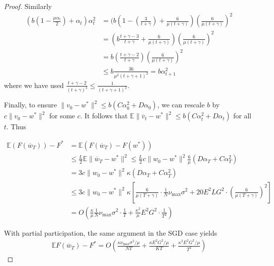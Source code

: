 \begin{proof}
Similarly 
\begin{align*}
(b(1-\frac{\mu\alpha_{t}}{2})+\alpha_{t})\alpha_{t}^{2} & =(b(1-(\frac{3}{t+\gamma})+\frac{6}{\mu(t+\gamma)})(\frac{6}{\mu(t+\gamma)})^{2}\\
& =(b\frac{t+\gamma-3}{t+\gamma}+\frac{6}{\mu(t+\gamma)})(\frac{6}{\mu(t+\gamma)})^{2}\\
& =b(\frac{t+\gamma-2}{t+\gamma})(\frac{6}{\mu(t+\gamma)})^{2}\\
& \leq b\frac{36}{\mu^{2}(t+\gamma+1)^{2}}=b\alpha_{t+1}^{2}
\end{align*}
where we have used $\frac{t+\gamma-2}{(t+\gamma)^{3}}\leq\frac{1}{(t+\gamma+1)^{2}}$.

Finally, to ensure $\|v_{0}-w^{\ast}\|^{2}\leq b(C\alpha_{0}^{2}+D\alpha_{0})$,
we can rescale $b$ by $c\|v_{0}-w^{\ast}\|^{2}$ for some $c.$ It
follows that $\mathbb{E}\|\overline{v}_{t}-w^{\ast}\|^{2}\leq b(C\alpha_{t}^{2}+D\alpha_{t})$
for all $t$. Thus 

\begin{align*}
\mathbb{E}(F(\overline{w}_{T}))-F^{\ast} & =\mathbb{E}(F(\overline{w}_{T})-F(w^{\ast}))\\
& \leq\frac{L}{2}\mathbb{E}\|\overline{w}_{T}-w^{\ast}\|^{2}\leq\frac{L}{2}c\|w_{0}-w^{\ast}\|^{2}\frac{6}{\mu}(D\alpha_{T}+C\alpha_{T}^{2})\\
& =3c\|w_{0}-w^{\ast}\|^{2}\kappa(D\alpha_{T}+C\alpha_{T}^{2})\\
& \leq3c\|w_{0}-w^{\ast}\|^{2}\kappa\left[\frac{6}{\mu(T+\gamma)}\cdot\frac{1}{N}\nu_{\max}\sigma^{2}+20E^{2}LG^{2}\cdot(\frac{6}{\mu(T+\gamma)})^{2}\right]\\
& =O(\frac{\kappa}{\mu}\frac{1}{N}\nu_{\max}\sigma^{2}\cdot\frac{1}{T}+\frac{\kappa^{2}}{\mu}E^{2}G^{2}\cdot\frac{1}{T^{2}})
\end{align*}

With partial participation, the same argument in the SGD case yields
\begin{align*}
\mathbb{E}F(\overline{w}_{T})-F^{\ast}=O(\frac{\kappa\nu_{\max}\sigma^{2}/\mu}{NT}+\frac{\kappa E^{2}G^{2}/\mu}{KT}+\frac{\kappa^{2}E^{2}G^{2}/\mu}{T^{2}})
\end{align*}
\end{proof}